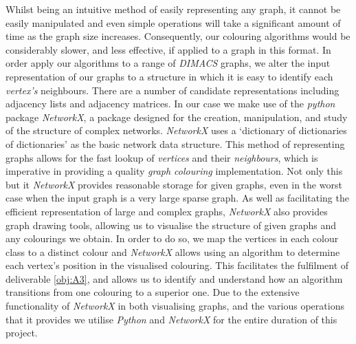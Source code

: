 \documentclass[12pt,a4paper]{article}
\begin{document}
\par Whilst being an intuitive method of easily representing any graph, it cannot be easily manipulated and even simple operations will take a significant amount of time as the graph size increases. Consequently, our colouring algorithms would be considerably slower, and less effective, if applied to a graph in this format. In order apply our algorithms to a range of \textit{DIMACS} graphs, we alter the input representation of our graphs to a structure in which it is easy to identify each \textit{vertex's} neighbours. There are a number of candidate representations including adjacency lists and adjacency matrices. In our case we make use of the \textit{python} package \textit{NetworkX}, a package designed for the creation, manipulation, and study of the structure of complex networks. \textit{NetworkX} uses a `dictionary of dictionaries of dictionaries' as the basic network data structure. This method of representing graphs allows for the fast lookup of \textit{vertices} and their \textit{neighbours}, which is imperative in providing a quality \textit{graph colouring} implementation. Not only this but it \textit{NetworkX} provides reasonable storage for given graphs, even in the worst case when the input graph is a very large sparse graph. As well as facilitating the efficient representation of large and complex graphs, \textit{NetworkX} also provides graph drawing tools, allowing us to visualise the structure of given graphs and any colourings we obtain. In order to do so, we map the vertices in each colour class to a distinct colour and \textit{NetworkX} allows using an algorithm to determine each vertex's position in the visualised colouring. This facilitates the fulfilment of deliverable \ref{obj:A3}, and allows us to identify and understand how an algorithm transitions from one colouring to a superior one. Due to the extensive functionality of \textit{NetworkX} in both visualising graphs, and the various operations that it provides we utilise \textit{Python} and \textit{NetworkX} for the entire duration of this project.
\end{document}
